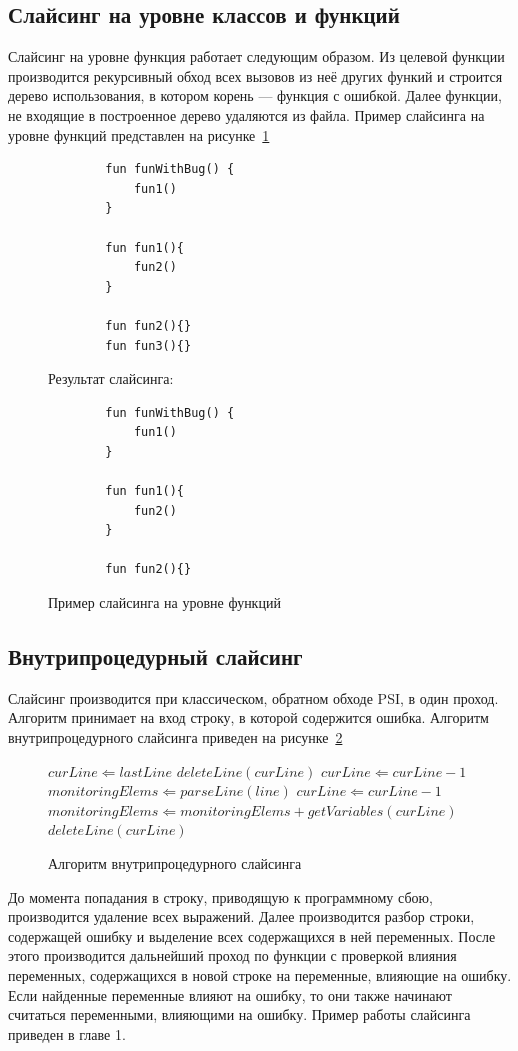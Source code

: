 \subsection{Слайсинг на уровне классов и функций}
Слайсинг на уровне функция работает следующим образом. Из целевой функции производится рекурсивный обход всех вызовов из неё других функий и строится дерево использования, в котором корень --- функция с ошибкой. Далее функции, не входящие в построенное дерево удаляются из файла. Пример слайсинга на уровне функций представлен на рисунке~\ref{funslicing}
\begin{figure}
	\begin{lstlisting}
		fun funWithBug() {
			fun1()
		}
		
		fun fun1(){
			fun2()		
		}
		
		fun fun2(){}
		fun fun3(){}
	\end{lstlisting}
	Результат слайсинга:
	\begin{lstlisting}
		fun funWithBug() {
			fun1()
		}
		
		fun fun1(){
			fun2()		
		}
		
		fun fun2(){}
	\end{lstlisting}
	\caption{\label{funslicing}Пример слайсинга на уровне функций}
\end{figure}
\subsection{Внутрипроцедурный слайсинг}
Слайсинг производится при классическом, обратном обходе PSI, в один проход. Алгоритм принимает на вход строку, в которой содержится ошибка. Алгоритм внутрипроцедурного слайсинга приведен на рисунке~\ref{alg:interproceduralslicing}
\begin{figure}
\begin{algorithmic}[1]
\STATE $curLine \Leftarrow lastLine$
	\STATE $deleteLine(curLine)$
	\STATE $curLine \Leftarrow curLine - 1$
\ENDWHILE
\STATE $monitoringElems \Leftarrow parseLine(line)$
\STATE $curLine \Leftarrow curLine - 1$
		\STATE $monitoringElems \Leftarrow monitoringElems + getVariables(curLine)$ 
	\ELSE 
		\STATE $deleteLine(curLine)$ 
	\ENDIF
\ENDWHILE
\end{algorithmic}
\caption{\label{alg:interproceduralslicing}Алгоритм внутрипроцедурного слайсинга}
\end{figure}


До момента попадания в строку, приводящую к программному сбою, производится удаление всех выражений. Далее производится разбор строки, содержащей ошибку и выделение всех содержащихся в ней переменных. После этого производится дальнейший проход по функции с проверкой влияния переменных, содержащихся в новой строке на переменные, влияющие на ошибку. Если найденные переменные влияют на ошибку, то они также начинают считаться переменными, влияющими на ошибку. Пример работы слайсинга приведен в главе 1.



